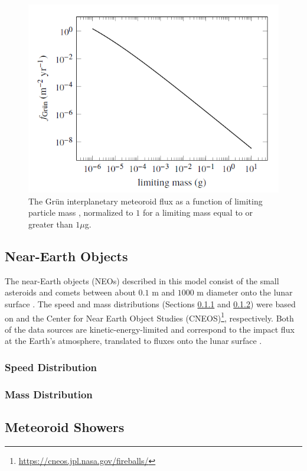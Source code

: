 \documentclass{article}
\begin{document}
\begin{figure}[!htb]
	\centering
	\includegraphics[scale=0.65]{MEM_UG_Fig2.1_partile-mass-distribution.PNG}
	\caption{The Gr{\"u}n interplanetary meteoroid flux as a function of limiting particle mass \citep[Figure 1]{moorhead2019nasa}, normalized to $1$ for a limiting mass equal to or greater than $1\mu$g.}\label{fig:MEM_UG_Fig2.1_partile-mass-distribution}
\end{figure}

	
\subsection{Near-Earth Objects}\label{ssec:Near-Earth Objects}

The near-Earth objects (NEOs) described in this model consist of the small asteroids and comets between about $0.1$ m and $1000$ m diameter onto the lunar surface \citep{moorhead2020memo}. The speed and mass distributions (Sections \ref{sssec:NEO:Speed Distribution} and \ref{sssec:NEO:Mass Distribution}) were based on \cite{brown2002flux} and the Center for Near Earth Object Studies (CNEOS)\footnote{\url{https://cneos.jpl.nasa.gov/fireballs/}}, respectively. Both of the data sources are kinetic-energy-limited and correspond to the impact flux at the Earth's atmosphere, translated to fluxes onto the lunar surface \citep{moorhead2020memo}.

\subsubsection{Speed Distribution}\label{sssec:NEO:Speed Distribution}


\subsubsection{Mass Distribution}\label{sssec:NEO:Mass Distribution}




\subsection{Meteoroid Showers}\label{ssec:Meteoroid Showers}

	
\end{document}
